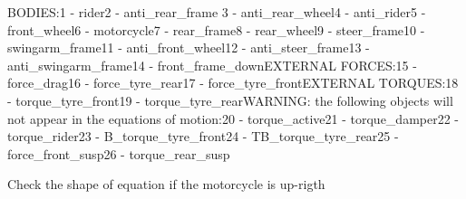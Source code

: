 \documentclass{article}
\begin{document}
\begin{maplegroup}
\begin{mapleinput}
\end{mapleinput}
\mapleresult
BODIES:1 - rider2 - anti\_rear\_frame
3 - anti\_rear\_wheel4 - anti\_rider5 - front\_wheel6 - motorcycle7 - rear\_frame8 - rear\_wheel9 - steer\_frame10 - swingarm\_frame11 - anti\_front\_wheel12 - anti\_steer\_frame13 - anti\_swingarm\_frame14 - front\_frame\_downEXTERNAL FORCES:15 - force\_drag16 - force\_tyre\_rear17 - force\_tyre\_frontEXTERNAL TORQUES:18 - torque\_tyre\_front19 - torque\_tyre\_rearWARNING: the following objects will not appear in the equations of motion:20 - torque\_active21 - torque\_damper22 - torque\_rider23 - B\_torque\_tyre\_front24 - TB\_torque\_tyre\_rear25 - force\_front\_susp26 - torque\_rear\_susp\mapleresult
\begin{maplelatex}
\end{maplelatex}
\end{maplegroup}
\begin{maplegroup}
\begin{mapleinput}
\end{mapleinput}
\end{maplegroup}
\begin{maplegroup}
\begin{Maple Normal}{
Check the shape of equation if the motorcycle is up-rigth}\end{Maple Normal}

\end{maplegroup}
\begin{maplegroup}
\begin{mapleinput}
\end{mapleinput}
\mapleresult
\begin{maplelatex}
\end{maplelatex}
\end{maplegroup}
\end{document}
